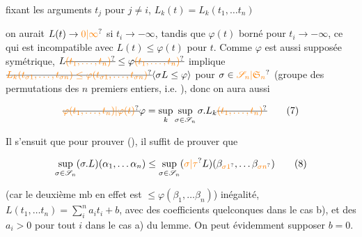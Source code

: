 
fixant les arguments $t_j$ pour $j\ne i$, $L_k(t)=L_k(t_1,\ldots t_n)$ 

on aurait $L(t)\to\unsure{0|\infty}$ si $t_i\to-\infty$, tandis que $\varphi(t)$  borné pour $t_i\to-\infty$, ce  qui est incompatible avec $L(t)\leq\varphi(t)$ pour  $t$.  Comme  $\varphi$ est aussi supposée symétrique, $L\deleted{\unsure{(t_1,\ldots,t_n)}}\leq\varphi\deleted{\unsure{(t_1,\ldots,t_n)}}$  implique $\deleted{\unsure{L_k(t_{\sigma1},\ldots,t_{\sigma n})\leq\varphi(t_{\sigma1},\ldots,t_{\sigma n})}}\inserted{\sigma L\leq\varphi}$ pour  $\sigma\in\unsure{\mathscr S_n|\mathfrak S_n}$ (groupe des permutations des $n$ premiers entiers, i.e. ), donc on aura aussi

\[
\deleted{\unsure{\varphi(t_1,\ldots,t_n)|\varphi(t)}}\varphi=\sup_k\sup_{\sigma\in\mathscr S_n}\sigma.L_{k}\deleted{\unsure{(t_1,\ldots,t_n)}}\tag*{(7)}
\]

Il s'ensuit que  pour prouver (), il suffit de prouver que  

\[
\sup_{\sigma\in\mathscr S_n}(\sigma.L)(\alpha_1,\ldots\alpha_n)\leq\sup_{\sigma\in\mathscr S_n}(\unsure{\sigma|\tau}L)(\beta_{\unsure{\sigma1}},\ldots\beta_{\unsure{\sigma n}})\tag*{(8)}
\]

(car le deuxième mb en effet est $\leq\varphi(\beta_1,\ldots\beta_n)$)  inégalité,  $L(t_1,\ldots t_n)=\sum_i^n a_it_i+b$,  avec des  coefficients quelconques dans le cas b), et des $a_i>0$ pour tout $i$ dans le cas a) du lemme.  On peut évidemment  supposer $b=0$.

